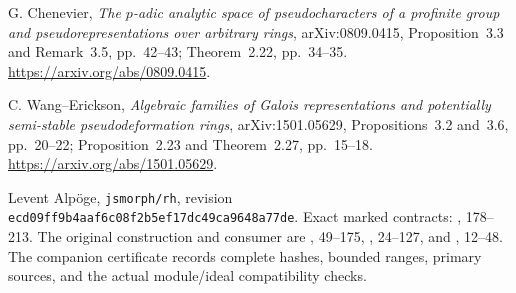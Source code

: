 G. Chenevier, \emph{The $p$-adic analytic space of pseudocharacters of a
profinite group and pseudorepresentations over arbitrary rings},
arXiv:0809.0415, Proposition~3.3 and Remark~3.5, pp.~42--43;
Theorem~2.22, pp.~34--35.
\url{https://arxiv.org/abs/0809.0415}.

C. Wang--Erickson, \emph{Algebraic families of Galois representations
and potentially semi-stable pseudodeformation rings},
arXiv:1501.05629, Propositions~3.2 and~3.6, pp.~20--22;
Proposition~2.23 and Theorem~2.27, pp.~15--18.
\url{https://arxiv.org/abs/1501.05629}.

Levent Alp\"oge, \texttt{jsmorph/rh},
revision \texttt{ecd09ff9b4aaf6c08f2b5ef17dc49ca9648a77de}.
Exact marked contracts: , 178--213.
The original construction and consumer are
, 49--175,
, 24--127, and
, 12--48.
The companion 
certificate records complete hashes, bounded ranges, primary sources,
and the actual module/ideal compatibility checks.
